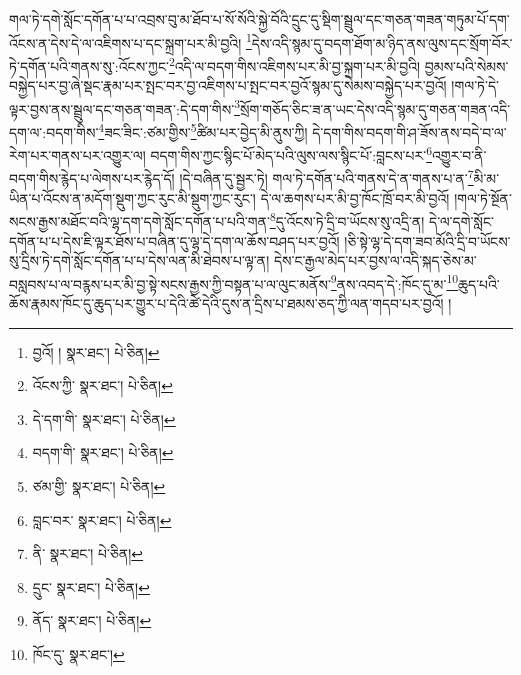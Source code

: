གལ་ཏེ་དགེ་སློང་དགོན་པ་པ་འབྲས་བུ་མ་ཐོབ་པ་སོ་སོའི་སྐྱེ་བོའི་དྲུང་དུ་སྡིག་སྦྲུལ་དང་གཅན་གཟན་གཏུམ་པོ་དག་འོངས་ན་དེས་དེ་ལ་འཇིགས་པ་དང་སྐྲག་པར་མི་བྱའི། \footnote{བྱའོ། །   སྣར་ཐང་།  པེ་ཅིན། }དེས་འདི་སྙམ་དུ་བདག་ཐོག་མ་ཉིད་ནས་ལུས་དང་སྲོག་བོར་ཏེ་དགོན་པའི་གནས་སུ་:འོངས་ཀྱང་\footnote{འོངས་ཀྱི་  སྣར་ཐང་།  པེ་ཅིན། }འདི་ལ་བདག་གིས་འཇིགས་པར་མི་བྱ་སྐྲག་པར་མི་བྱའི། བྱམས་པའི་སེམས་བསྐྱེད་པར་བྱ་ཞེ་སྡང་རྣམ་པར་སྤང་བར་བྱ་འཇིགས་པ་སྤང་བར་བྱའོ་སྙམ་དུ་སེམས་བསྐྱེད་པར་བྱའོ། །གལ་ཏེ་དེ་ལྟར་བྱས་ནས་སྦྲུལ་དང་གཅན་གཟན་:དེ་དག་གིས་\footnote{དེ་དག་གི་  སྣར་ཐང་།  པེ་ཅིན། }སྲོག་གཅོད་ཅིང་ཟ་ན་ཡང་དེས་འདི་སྙམ་དུ་གཅན་གཟན་འདི་དག་ལ་:བདག་གིས་\footnote{བདག་གི་  སྣར་ཐང་།  པེ་ཅིན། }ཟང་ཟིང་:ཙམ་གྱིས་\footnote{ཙམ་གྱི་  སྣར་ཐང་།  པེ་ཅིན། }ཚིམ་པར་བྱེད་མི་ནུས་ཀྱི། དེ་དག་གིས་བདག་གི་ཤ་ཟོས་ནས་བདེ་བ་ལ་རེག་པར་གནས་པར་འགྱུར་ལ། བདག་གིས་ཀྱང་སྙིང་པོ་མེད་པའི་ལུས་ལས་སྙིང་པོ་:བླངས་པར་\footnote{བླང་བར་  སྣར་ཐང་།  པེ་ཅིན། }འགྱུར་བ་ནི་བདག་གིས་རྙེད་པ་ལེགས་པར་རྙེད་དོ། །དེ་བཞིན་དུ་སྦྱར་ཏེ། གལ་ཏེ་དགོན་པའི་གནས་དེ་ན་གནས་པ་ན་\footnote{ནི་  སྣར་ཐང་།  པེ་ཅིན། }མི་མ་ཡིན་པ་འོངས་ན་མདོག་སྡུག་ཀྱང་རུང་མི་སྡུག་ཀྱང་རུང་། དེ་ལ་ཆགས་པར་མི་བྱ་ཁོང་ཁྲོ་བར་མི་བྱའོ། །གལ་ཏེ་སྔོན་སངས་རྒྱས་མཐོང་བའི་ལྷ་དག་དགེ་སློང་དགོན་པ་པའི་གན་\footnote{དྲུང་  སྣར་ཐང་།  པེ་ཅིན། }དུ་འོངས་ཏེ་དྲི་བ་ཡོངས་སུ་འདྲི་ན། དེ་ལ་དགེ་སློང་དགོན་པ་པ་དེས་ཇི་ལྟར་ཐོས་པ་བཞིན་དུ་ལྷ་དེ་དག་ལ་ཆོས་བཤད་པར་བྱའོ། །ཅི་སྟེ་ལྷ་དེ་དག་ཟབ་མོའི་དྲི་བ་ཡོངས་སུ་དྲིས་ཏེ་དགེ་སློང་དགོན་པ་པ་དེས་ལན་མི་ཐེབས་པ་ལྟ་ན། དེས་ང་རྒྱལ་མེད་པར་བྱས་ལ་འདི་སྐད་ཅེས་མ་བསླབས་པ་ལ་བརྙས་པར་མི་བྱ་སྟེ་སངས་རྒྱས་ཀྱི་བསྟན་པ་ལ་ལུང་མནོས་\footnote{ནོད་  སྣར་ཐང་།  པེ་ཅིན། }ནས་འབད་དེ་:ཁོང་དུ་མ་\footnote{ཁོང་དུ་  སྣར་ཐང་། }ཆུད་པའི་ཆོས་རྣམས་ཁོང་དུ་ཆུད་པར་གྱུར་པ་དེའི་ཚེ་དེའི་དུས་ན་དྲིས་པ་ཐམས་ཅད་ཀྱི་ལན་གདབ་པར་བྱའོ། །
